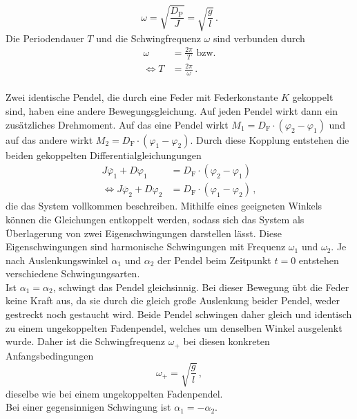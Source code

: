 \begin{equation*}
 \omega = \sqrt{\frac{D_{\text{P}}}{J}} = \sqrt{\frac{g}{l}}\, .
\end{equation*}
Die Periodendauer $T$ und die Schwingfrequenz $\omega$ sind verbunden durch 
\begin{align}
    \omega &= \frac{2 \pi}{T} \,\,\text{bzw.} \label{eqn:VerbindungOmegaT}\\
    \Leftrightarrow T &= \frac{2 \pi}{\omega} \label{eqn:VerbindungTOmega}\, .
\end{align}
\\
Zwei identische Pendel, die durch eine Feder mit Federkonstante $K$ gekoppelt sind, haben eine andere Bewegungsgleichung. 
Auf jeden Pendel wirkt dann ein zusätzliches Drehmoment. Auf das eine Pendel wirkt $M_1 = D_{\text{F}} \cdot (\varphi_2 - \varphi_1)$ 
und auf das andere wirkt $M_2 = D_{\text{F}} \cdot (\varphi_1 - \varphi_2)$. 
Durch diese Kopplung entstehen die beiden gekoppelten Differentialgleichungungen
\begin{align*}
J \ddot{\varphi_1} + D \varphi_1 &= D_{\text{F}} \cdot \left( \varphi_{2} - \varphi_{1} \right) \\
\Leftrightarrow J \ddot{\varphi_2} + D \varphi_2 &= D_{\text{F}} \cdot \left( \varphi_{1} - \varphi_{2} \right) \, ,
\end{align*}
die das System vollkommen beschreiben.
Mithilfe eines geeigneten Winkels können die Gleichungen entkoppelt werden, sodass sich das System als Überlagerung von zwei Eigenschwingungen darstellen lässt. 
Diese Eigenschwingungen sind harmonische Schwingungen mit Frequenz $\omega_{1}$ und $\omega_{2}$. 
Je nach Auslenkungswinkel $\alpha_1$ und $\alpha_2$ der Pendel beim Zeitpunkt $t = 0$ entstehen verschiedene Schwingungsarten. 
\\
Ist $\alpha_1 = \alpha_2$, schwingt das Pendel gleichsinnig. Bei dieser Bewegung übt die Feder keine Kraft aus, da sie durch die gleich große Auslenkung beider
Pendel, weder gestreckt noch gestaucht wird. Beide Pendel schwingen daher gleich und identisch zu einem ungekoppelten Fadenpendel, welches um 
denselben Winkel ausgelenkt wurde. Daher ist die Schwingfrequenz $\omega_+$ bei diesen konkreten Anfangsbedingungen 
\begin{equation}
    \omega_+ = \sqrt{\frac{g}{l}}\, ,
    \label{eqn:OmegaGleichsinnig}
\end{equation}
dieselbe wie bei einem ungekoppelten Fadenpendel. \\
Bei einer gegensinnigen Schwingung ist $\alpha_1 = - \alpha_2$. 

